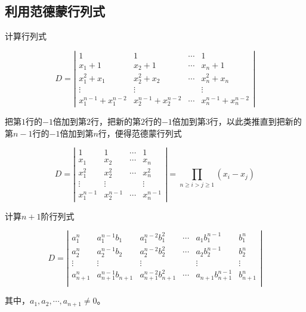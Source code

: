 \subsection{利用范德蒙行列式}

\begin{example}
    计算行列式

$$D=\left|\begin{array}{cccccc}
        1                       & 1                       & \cdots & 1                       \\
        x_{1}+1                 & x_{2}+1                 & \cdots & x_{n}+1                 \\
        x_{1}^{2}+x_{1}         & x_{2}^{2}+x_{2}         & \cdots & x_{n}^{2}+x_{n}         \\
        \vdots                  & \vdots                  &        & \vdots                  \\
        x_{1}^{n-1}+x_{1}^{n-2} & x_{2}^{n-1}+x_{2}^{n-2} & \cdots & x_{n}^{n-1}+x_{n}^{n-2}
    \end{array}\right|$$
\end{example}

\begin{solution}
    把第$1$行的$-1$倍加到第$2$行，把新的第$2$行的$-1$倍加到第3行，以此类推直到把新的第$n-1$行的$-1$倍加到第$n$行，便得范德蒙行列式

$$D=\left|\begin{array}{cccccc}
        1           & 1           & \cdots & 1           \\
        x_{1}       & x_{2}       & \cdots & x_{n}       \\
        x_{1}^{2}   & x_{2}^{2}   & \cdots & x_{n}^{2}   \\
        \vdots      & \vdots      &        & \vdots      \\
        x_{1}^{n-1} & x_{2}^{n-1} & \cdots & x_{n}^{n-1}
    \end{array}\right|=\prod_{n\ge i > j\ge 1}^{} (x_{i}-x_{j})
$$
\end{solution}

\begin{example}
    计算$n+1$阶行列式

$$D=\left|\begin{array}{ccccccc}
        a_{1}^{n}   & a_{1}^{n-1}b_{1}     & a_{1}^{n-2}b_{1}^{2}     & \cdots & a_{1}b_{1}^{n-1}     & b_{1}^{n}   \\
        a_{2}^{n}   & a_{2}^{n-1}b_{2}     & a_{2}^{n-2}b_{2}^{2}     & \cdots & a_{2}b_{2}^{n-1}     & b_{2}^{n}   \\
        \vdots      & \vdots               & \vdots                   &        & \vdots               & \vdots      \\
        a_{n+1}^{n} & a_{n+1}^{n-1}b_{n+1} & a_{n+1}^{n-2}b_{n+1}^{2} & \cdots & a_{n+1}b_{n+1}^{n-1} & b_{n+1}^{n} \\
    \end{array}\right|$$

其中，$a_{1},a_{2},\cdots,a_{n+1} \neq 0$。
\end{example}

